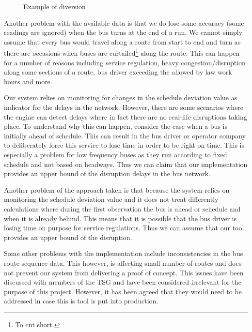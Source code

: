 \begin{figure}[ht]
	\caption{Example of diversion}
	\label{fig:diversion}
\end{figure}

Another problem with the available data is that we do lose some accuracy (some readings are ignored) when the bus turns at the end of a run. We cannot simply assume that every bus would travel along a route from start to end and turn as there are occasions when buses are curtailed\footnote{To cut short.} along the route. This can happen for a number of reasons including service regulation, heavy congestion/disruption along some sections of a route, bus driver exceeding the allowed by law work hours and more.

Our system relies on monitoring for changes in the schedule deviation value as indicator for the delays in the network. However, there are some scenarios where the engine can detect delays where in fact there are no real-life disruptions taking place. To understand why this can happen, consider the case when a bus is initially ahead of schedule. This can result in the bus driver or operator company to deliberately force this service to lose time in order to be right on time. This is especially a problem for low frequency buses as they run according to fixed schedule and not based on headways. Thus we can claim that our implementation provides an upper bound of the disruption delays in the bus network.

Another problem of the approach taken is that because the system relies on monitoring the schedule deviation value and it does not treat differently calculations where during the first observation the bus is ahead or schedule and when it is already behind. This means that it is possible that the bus driver is losing time on purpose for service regulations. Thus we can assume that our tool provides an upper bound of the disruption.

Some other problems with the implementation include inconsistencies in the bus route sequence data. This however, is affecting small number of routes and does not prevent our system from delivering a proof of concept. This issues have been discussed with members of the TSG and have been considered irrelevant for the purpose of this project. However, it has been agreed that they would need to be addressed in case this is tool is put into production. 

